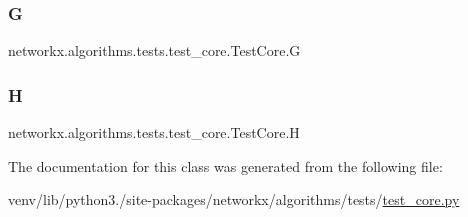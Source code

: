 \subsubsection{\texorpdfstring{G}{G}}
{\footnotesize\ttfamily networkx.\+algorithms.\+tests.\+test\+\_\+core.\+Test\+Core.\+G}

\mbox{\label{classnetworkx_1_1algorithms_1_1tests_1_1test__core_1_1TestCore_a52aa0f5bb6a4babb7190a2020bd9d2a1}} 
\subsubsection{\texorpdfstring{H}{H}}
{\footnotesize\ttfamily networkx.\+algorithms.\+tests.\+test\+\_\+core.\+Test\+Core.\+H}



The documentation for this class was generated from the following file\+:\begin{DoxyCompactItemize}
\item 
venv/lib/python3./site-\/packages/networkx/algorithms/tests/\hyperlink{networkx_2algorithms_2tests_2test__core_8py}{test\+\_\+core.\+py}\end{DoxyCompactItemize}

